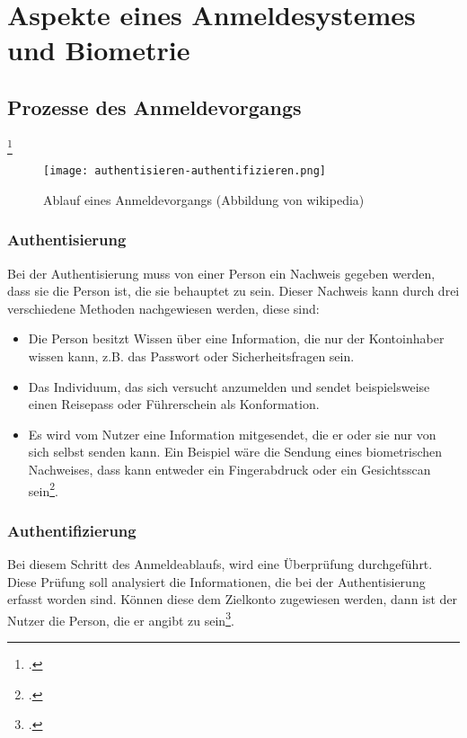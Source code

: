 \chapter{Aspekte eines Anmeldesystemes und Biometrie}
\strahlhofer

\section{Prozesse des Anmeldevorgangs}\footcite{authentifizierung}
\begin{center}
\begin{figure}[h]
    \centering
    \texttt{[image: authentisieren-authentifizieren.png]}
    \caption{Ablauf eines Anmeldevorgangs (Abbildung von wikipedia)}
\end{figure}
\end{center}

\subsection{Authentisierung} 
Bei der Authentisierung muss von einer Person ein Nachweis gegeben werden, dass sie die Person ist, die sie behauptet zu sein. Dieser Nachweis kann durch drei verschiedene Methoden nachgewiesen werden, diese sind:
\begin{itemize}
	\item Die Person besitzt Wissen über eine Information, die nur der Kontoinhaber wissen kann, z.B. das Passwort oder Sicherheitsfragen sein.
	\item Das Individuum, das sich versucht anzumelden und sendet beispielsweise einen Reisepass oder Führerschein als Konformation.
	\item Es wird vom Nutzer eine Information mitgesendet, die er oder sie nur von sich selbst senden kann. Ein Beispiel wäre die Sendung eines biometrischen Nachweises, dass kann entweder ein Fingerabdruck oder ein Gesichtsscan sein\footcite{anmeldevorgangs}.
\end{itemize}

\subsection{Authentifizierung}
Bei diesem Schritt des Anmeldeablaufs, wird eine Überprüfung durchgeführt. Diese Prüfung soll analysiert die Informationen, die bei der Authentisierung erfasst worden sind. Können diese dem Zielkonto zugewiesen werden, dann ist der Nutzer die Person, die er angibt zu sein\footcite{anmeldevorgangs}.

